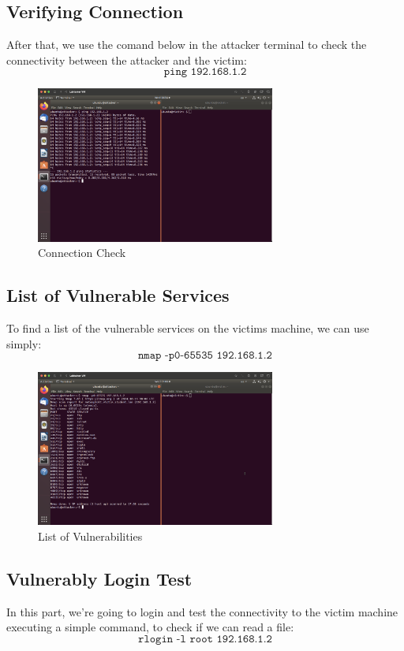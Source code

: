 \documentclass[a4paper,11pt]{article} %
\begin{document}
\subsection{Verifying Connection}
After that, we use the comand below in the attacker terminal to check the connectivity between the attacker and the victim:
\[\texttt{ping 192.168.1.2}\]

\break

\begin{figure}[h!]
    \centering
    \includegraphics[width=0.7\textwidth]{images/02.png}
    \caption{Connection Check}
\end{figure}

\subsection{List of Vulnerable Services}
To find a list of the vulnerable services on the victims machine, we can use simply:
\[\texttt{nmap -p0-65535 192.168.1.2}\]

\begin{figure}[h!]
    \centering
    \includegraphics[width=0.7\textwidth]{images/03.png}
    \caption{List of Vulnerabilities}
\end{figure}

\subsection{Vulnerably Login Test}
In this part, we're going to login and test the connectivity to the victim machine executing a simple command, to check if we can read a file:
\[\texttt{rlogin -l root 192.168.1.2}\]
\end{document}
